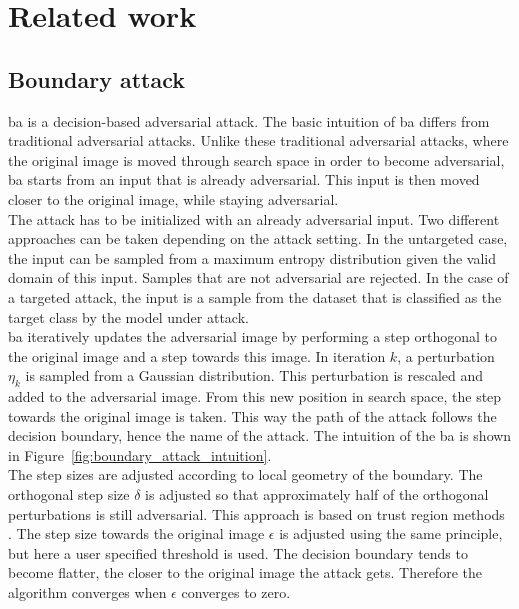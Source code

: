 \chapter{Related work}
\section{Boundary attack}
\gls{ba} \cite{boundary_attack} is a decision-based adversarial attack. The basic intuition of \gls{ba} differs from traditional adversarial attacks. Unlike these traditional adversarial attacks, where the original image is moved through search space in order to become adversarial, \gls{ba} starts from an input that is already adversarial. This input is then moved closer to the original image, while staying adversarial.\\

The attack has to be initialized with an already adversarial input. Two different approaches can be taken depending on the attack setting. In the untargeted case, the input can be sampled from a maximum entropy distribution given the valid domain of this input. Samples that are not adversarial are rejected. In the case of a targeted attack, the input is a sample from the dataset that is classified as the target class by the model under attack.\\

\gls{ba} iteratively updates the adversarial image by performing a step orthogonal to the original image and a step towards this image. In iteration $k$, a perturbation $\eta_k$ is sampled from a Gaussian distribution. This perturbation is rescaled and added to the adversarial image. From this new position in search space, the step towards the original image is taken. This way the path of the attack follows the decision boundary, hence the name of the attack. The intuition of the \gls{ba} is shown in Figure~\ref{fig:boundary_attack_intuition}.\\

The step sizes are adjusted according to local geometry of the boundary. The orthogonal step size $\delta$ is adjusted so that approximately half of the orthogonal perturbations is still adversarial. This approach is based on trust region methods \cite{trm}. The step size towards the original image $\epsilon$ is adjusted using the same principle, but here a user specified threshold is used. The decision boundary tends to become flatter, the closer to the original image the attack gets. Therefore the algorithm converges when $\epsilon$ converges to zero.\\

